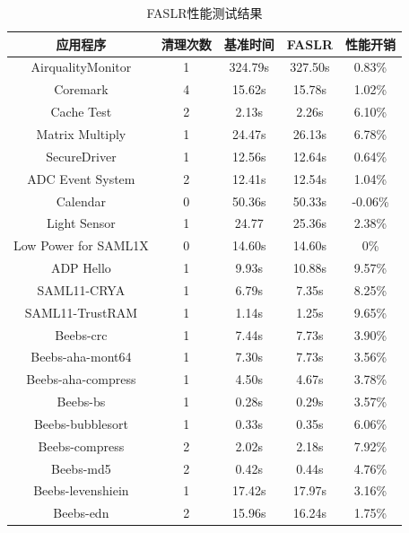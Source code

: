\documentclass[UTF8,12pt,a4paper]{ctexart}
\numberwithin{figure}{section}
\begin{document}
\begin{longtable}{ccccc}
    \caption{FASLR性能测试结果}  %
    \label{table1}                                            \\ %
    \hline
    应用程序                 & 清理次数 & 基准时间    & FASLR   & 性能开销    \\ \hline
    AirqualityMonitor    & 1    & 324.79s & 327.50s & 0.83\%  \\ 
    Coremark             & 4    & 15.62s  & 15.78s  & 1.02\%  \\ 
    Cache Test           & 2    & 2.13s   & 2.26s   & 6.10\%  \\ 
    Matrix Multiply      & 1    & 24.47s  & 26.13s  & 6.78\%  \\ 
    SecureDriver         & 1    & 12.56s  & 12.64s  & 0.64\%  \\ 
    ADC Event System     & 2    & 12.41s  & 12.54s  & 1.04\%  \\ 
    Calendar             & 0    & 50.36s  & 50.33s  & -0.06\% \\ 
    Light Sensor         & 1    & 24.77   & 25.36s  & 2.38\%  \\ 
    Low Power for SAML1X & 0    & 14.60s  & 14.60s  & 0\%     \\ 
    ADP Hello            & 1    & 9.93s   & 10.88s  & 9.57\%  \\ 
    SAML11-CRYA          & 1    & 6.79s   & 7.35s   & 8.25\%  \\ 
    SAML11-TrustRAM      & 1    & 1.14s   & 1.25s   & 9.65\%  \\ 
    Beebs-crc            & 1    & 7.44s   & 7.73s   & 3.90\%  \\ 
    Beebs-aha-mont64     & 1    & 7.30s   & 7.73s   & 3.56\%  \\ 
    Beebs-aha-compress   & 1    & 4.50s   & 4.67s   & 3.78\%  \\ 
    Beebs-bs             & 1    & 0.28s   & 0.29s   & 3.57\%  \\ 
    Beebs-bubblesort     & 1    & 0.33s   & 0.35s   & 6.06\%  \\ 
    Beebs-compress       & 2    & 2.02s   & 2.18s   & 7.92\%  \\ 
    Beebs-md5            & 2    & 0.42s   & 0.44s   & 4.76\%  \\ 
    Beebs-levenshiein    & 1    & 17.42s  & 17.97s  & 3.16\%  \\ 
    Beebs-edn            & 2    & 15.96s  & 16.24s  & 1.75\%  \\ \hline
\end{longtable}
\end{document}
